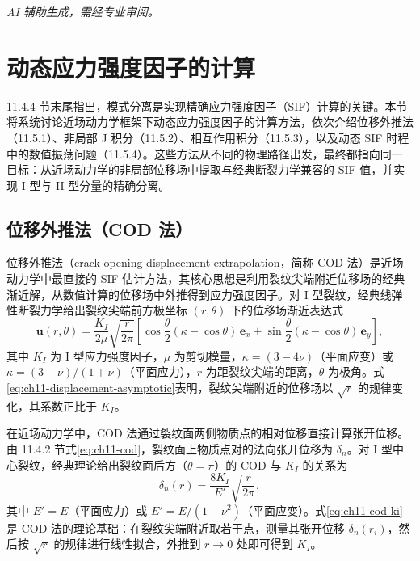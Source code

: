 \emph{AI 辅助生成，需经专业审阅。}

\section{动态应力强度因子的计算}\label{sec:ch11-dynamic-sif}

11.4.4 节末尾指出，模式分离是实现精确应力强度因子（SIF）计算的关键。本节将系统讨论近场动力学框架下动态应力强度因子的计算方法，依次介绍位移外推法（11.5.1）、非局部 J 积分（11.5.2）、相互作用积分（11.5.3），以及动态 SIF 时程中的数值振荡问题（11.5.4）。这些方法从不同的物理路径出发，最终都指向同一目标：从近场动力学的非局部位移场中提取与经典断裂力学兼容的 SIF 值，并实现 I 型与 II 型分量的精确分离。

\subsection{位移外推法（COD 法）}\label{sec:ch11-cod-method}

位移外推法（crack opening displacement extrapolation，简称 COD 法）是近场动力学中最直接的 SIF 估计方法，其核心思想是利用裂纹尖端附近位移场的经典渐近解，从数值计算的位移场中外推得到应力强度因子。对 I 型裂纹，经典线弹性断裂力学给出裂纹尖端前方极坐标 $(r,\theta)$ 下的位移场渐近表达式
\begin{equation}
\mathbf{u}(r,\theta)=\frac{K_I}{2\mu}\sqrt{\frac{r}{2\pi}}\left[\cos\frac{\theta}{2}\left(\kappa-\cos\theta\right)\,\mathbf{e}_x+\sin\frac{\theta}{2}\left(\kappa-\cos\theta\right)\,\mathbf{e}_y\right],
\label{eq:ch11-displacement-asymptotic}
\end{equation}
其中 $K_I$ 为 I 型应力强度因子，$\mu$ 为剪切模量，$\kappa=(3-4\nu)$（平面应变）或 $\kappa=(3-\nu)/(1+\nu)$（平面应力），$r$ 为距裂纹尖端的距离，$\theta$ 为极角。式\eqref{eq:ch11-displacement-asymptotic}表明，裂纹尖端附近的位移场以 $\sqrt{r}$ 的规律变化，其系数正比于 $K_I$。

在近场动力学中，COD 法通过裂纹面两侧物质点的相对位移直接计算张开位移。由 11.4.2 节式\eqref{eq:ch11-cod}，裂纹面上物质点对的法向张开位移为 $\delta_n$。对 I 型中心裂纹，经典理论给出裂纹面后方（$\theta=\pi$）的 COD 与 $K_I$ 的关系为
\begin{equation}
\delta_n(r)=\frac{8K_I}{E'}\sqrt{\frac{r}{2\pi}},
\label{eq:ch11-cod-ki}
\end{equation}
其中 $E'=E$（平面应力）或 $E'=E/(1-\nu^2)$（平面应变）。式\eqref{eq:ch11-cod-ki}是 COD 法的理论基础：在裂纹尖端附近取若干点，测量其张开位移 $\delta_n(r_i)$，然后按 $\sqrt{r}$ 的规律进行线性拟合，外推到 $r\to 0$ 处即可得到 $K_I$。

